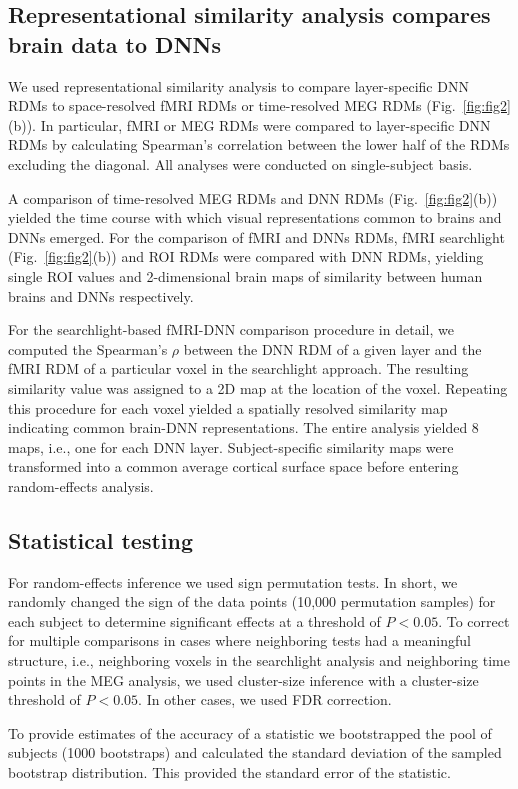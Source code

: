 \documentclass[10pt,twocolumn,letterpaper]{article}
\begin{document}
\subsection{Representational similarity analysis compares brain data to DNNs}
We used representational similarity analysis to compare layer-specific DNN RDMs to space-resolved fMRI RDMs or time-resolved MEG RDMs (Fig.~\ref{fig:fig2}(b)). In particular, fMRI or MEG RDMs were compared to layer-specific DNN RDMs by calculating Spearman's correlation between the lower half of the RDMs excluding the diagonal. All analyses were conducted on single-subject basis.

A comparison of time-resolved MEG RDMs and DNN RDMs (Fig.~\ref{fig:fig2}(b)) yielded the time course with which visual representations common to brains and DNNs emerged. For the comparison of fMRI and DNNs RDMs, fMRI searchlight (Fig.~\ref{fig:fig2}(b)) and ROI RDMs were compared with DNN RDMs, yielding single ROI values and 2-dimensional brain maps of similarity between human brains and DNNs respectively.

For the searchlight-based fMRI-DNN comparison procedure in detail, we computed the Spearman's $\rho$ between the DNN RDM of a given layer and the fMRI RDM of a particular voxel in the searchlight approach. The resulting similarity value was assigned to a 2D map at the location of the voxel. Repeating this procedure for each voxel yielded a spatially resolved similarity map indicating common brain-DNN representations. The entire analysis yielded 8 maps, i.e., one for each DNN layer. Subject-specific similarity maps were transformed into a common average cortical surface space before entering random-effects analysis.

\subsection{Statistical testing}
For random-effects inference we used sign permutation tests. In short, we randomly changed the sign of the data points (10,000 permutation samples) for each subject to determine significant effects at a threshold of $P < 0.05$. To correct for multiple comparisons in cases where neighboring tests had a meaningful structure, i.e., neighboring voxels in the searchlight analysis and neighboring time points in the MEG analysis, we used cluster-size inference with a cluster-size threshold of $P < 0.05$. In other cases, we used FDR correction.

To provide estimates of the accuracy of a statistic we bootstrapped the pool of subjects (1000 bootstraps) and calculated the standard deviation of the sampled bootstrap distribution. This provided the standard error of the statistic.
\end{document}
